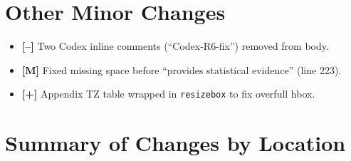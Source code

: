 \documentclass[12pt,a4paper]{article}
\newcommand{\ADD}[1]{\textcolor{addgreen}{\textbf{[+]} #1}}
\newcommand{\DEL}[1]{\textcolor{delred}{\textbf{[--]} #1}}
\newcommand{\MOD}[1]{\textcolor{modblue}{\textbf{[M]} #1}}
\begin{document}
\section{Other Minor Changes}

\begin{itemize}
\item \DEL{Two Codex inline comments} (``Codex-R6-fix'') removed from body.
\item \MOD{Fixed missing space} before ``provides statistical evidence'' (line 223).
\item \ADD{Appendix TZ table} wrapped in \texttt{resizebox} to fix overfull hbox.
\end{itemize}

\section{Summary of Changes by Location}
\end{document}
